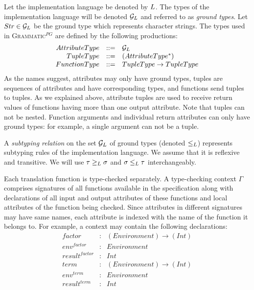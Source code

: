 \documentclass{llncs2e/llncs}
\newcommand{\ATF}{\textsc{Grammatic}$^{PG}$}
\begin{document}
Let the implementation language be denoted by $L$. The types of the implementation language will be denoted ${\mathcal{G}_L}$ and referred to as \emph{ground types}. Let $Str \in {\mathcal{G}_L}$ be the ground type which represents character strings. The types used in \ATF{} are defined by the following productions:
$$
\begin{array}{rcl}
	AttributeType &::=& {\mathcal{G}_L} \\
	TupleType &::=& (AttributeType^*) \\
	FunctionType &::=& TupleType \rightarrow TupleType\\
\end{array}
$$
As the names suggest, attributes may only have ground types, tuples are sequences of attributes and have corresponding types, and functions send tuples to tuples. As we explained above, attribute tuples are used to receive return values of functions having more than one output attribute. Note that tuples can not be nested. Function arguments and individual return attributes can only have ground types: for example, a single argument can not be a tuple.

A \emph{subtyping relation} on the set ${\mathcal{G}_L}$ of ground types (denoted $\le_L$) represents subtyping rules of the implementation language. We assume that it is reflexive and transitive. We will use $\tau \ge_L \sigma$ and $\sigma \le_L \tau$ interchangeably.

Each translation function is type-checked separately. A type-checking context $\Gamma$ comprises signatures of all functions available in the specification along with declarations of all input and output attributes of these functions and local attributes of the function being checked. Since attributes in different signatures may have same names, each attribute is indexed with the name of the function it belongs to. For example, a context may contain the following declarations:\\
$$\begin{array}{rcl}
factor&:& (Environment) \rightarrow (Int)\\
env^{factor} &:& Environment\\
result^{factor} &:& Int\\
term &:& (Environment) \rightarrow (Int)\\
env^{term} &:& Environment\\
result^{term} &:& Int\\
\end{array}$$
\end{document}
